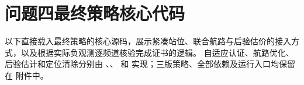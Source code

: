 \clearpage
\section{问题四最终策略核心代码}\label{app:q4code}
以下直接载入最终策略的核心源码，展示紧凑站位、联合航路与后验估价的接入方式，以及根据实际负观测逐频道核验完成证书的逻辑。
自适应认证、航路优化、后验估计和定位清除分别由
、、
和  实现；三版策略、全部依赖及运行入口均保留在  附件中。

